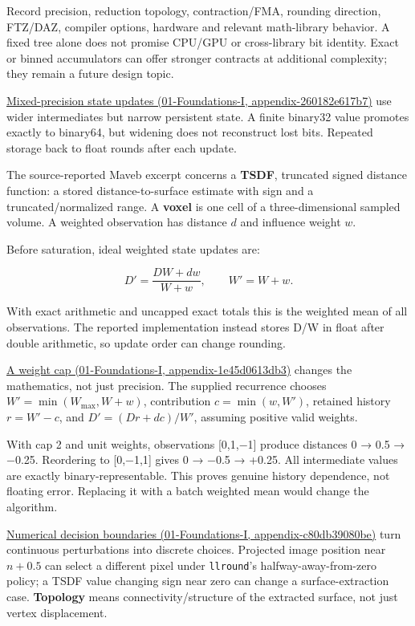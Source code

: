 Record precision, reduction topology, contraction/FMA, rounding direction, FTZ/DAZ, compiler options, hardware and relevant math-library behavior. A fixed tree alone does not promise CPU/GPU or cross-library bit identity. Exact or binned accumulators can offer stronger contracts at additional complexity; they remain a future design topic.

\href{../01-Foundations-I/main.pdf\#nameddest=appendix-260182e617b7}{Mixed-precision state updates (01-Foundations-I, appendix-260182e617b7)} use wider intermediates but narrow persistent state. A finite binary32 value promotes exactly to binary64, but widening does not reconstruct lost bits. Repeated storage back to float rounds after each update.

The source-reported Maveb excerpt concerns a \textbf{TSDF}, truncated signed distance function: a stored distance-to-surface estimate with sign and a truncated/normalized range. A \textbf{voxel} is one cell of a three-dimensional sampled volume. A weighted observation has distance \(d\) and influence weight \(w\).

Before saturation, ideal weighted state updates are:

\[
D'=\frac{DW+dw}{W+w},\qquad W'=W+w.
\]

With exact arithmetic and uncapped exact totals this is the weighted mean of all observations. The reported implementation instead stores D/W in float after double arithmetic, so update order can change rounding.

\href{../01-Foundations-I/main.pdf\#nameddest=appendix-1e45d0613db3}{A weight cap (01-Foundations-I, appendix-1e45d0613db3)} changes the mathematics, not just precision. The supplied recurrence chooses \(W'=\min(W_{\max},W+w)\), contribution \(c=\min(w,W')\), retained history \(r=W'-c\), and \(D'=(Dr+dc)/W'\), assuming positive valid weights.

With cap 2 and unit weights, observations {[}0,1,−1{]} produce distances 0 → 0.5 → −0.25. Reordering to {[}0,−1,1{]} gives 0 → −0.5 → +0.25. All intermediate values are exactly binary-representable. This proves genuine history dependence, not floating error. Replacing it with a batch weighted mean would change the algorithm.

\href{../01-Foundations-I/main.pdf\#nameddest=appendix-c80db39080be}{Numerical decision boundaries (01-Foundations-I, appendix-c80db39080be)} turn continuous perturbations into discrete choices. Projected image position near \(n+0.5\) can select a different pixel under \texttt{llround}'s halfway-away-from-zero policy; a TSDF value changing sign near zero can change a surface-extraction case. \textbf{Topology} means connectivity/structure of the extracted surface, not just vertex displacement.

